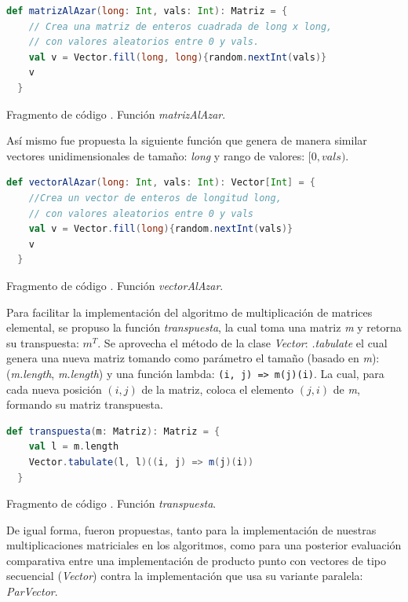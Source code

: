 \documentclass{article}
\newcounter{codesnippet}
\newcommand{\newcodesnippet}{%
  \stepcounter{codesnippet}%
}
\begin{document}
\newcodesnippet
\begin{lstlisting}[language=Scala]
  def matrizAlAzar(long: Int, vals: Int): Matriz = {
    // Crea una matriz de enteros cuadrada de long x long,
    // con valores aleatorios entre 0 y vals.
    val v = Vector.fill(long, long){random.nextInt(vals)}
    v
  }
\end{lstlisting}
\begin{center}
    \small{Fragmento de código \thecodesnippet. Función \textit{matrizAlAzar}.}
\end{center}

Así mismo fue propuesta la siguiente función que genera de manera similar vectores unidimensionales de tamaño: \textit{long} y rango de valores: \([0,vals)\).

\newcodesnippet
\begin{lstlisting}[language=Scala]
  def vectorAlAzar(long: Int, vals: Int): Vector[Int] = {
    //Crea un vector de enteros de longitud long,
    // con valores aleatorios entre 0 y vals
    val v = Vector.fill(long){random.nextInt(vals)}
    v
  }
\end{lstlisting}
\begin{center}
    \small{Fragmento de código \thecodesnippet. Función \textit{vectorAlAzar}.}
\end{center}

Para facilitar la implementación del algoritmo de multiplicación de matrices elemental, se propuso la función \textit{transpuesta}, la cual toma una matriz \textit{m} y retorna su transpuesta: \(m^T\). Se aprovecha el método de la clase \textit{Vector}: \textit{.tabulate} el cual genera una nueva matriz tomando como parámetro el tamaño (basado en \textit{m}): (\textit{m.length}, \textit{m.length}) y una función lambda: \verb|(i, j) => m(j)(i)|. La cual, para cada nueva posición \((i,j)\) de la matriz, coloca el elemento \((j,i)\) de \textit{m}, formando su matriz transpuesta.

\newcodesnippet
\begin{lstlisting}[language=Scala]
  def transpuesta(m: Matriz): Matriz = {
    val l = m.length
    Vector.tabulate(l, l)((i, j) => m(j)(i))
  }
\end{lstlisting}
\begin{center}
    \small{Fragmento de código \thecodesnippet. Función \textit{transpuesta}.}
\end{center}

De igual forma, fueron propuestas, tanto para la implementación de nuestras multiplicaciones matriciales en los algoritmos, como para una posterior evaluación comparativa entre una implementación de producto punto con vectores de tipo secuencial (\textit{Vector}) contra la implementación que usa su variante paralela: \textit{ParVector}.
\end{document}
